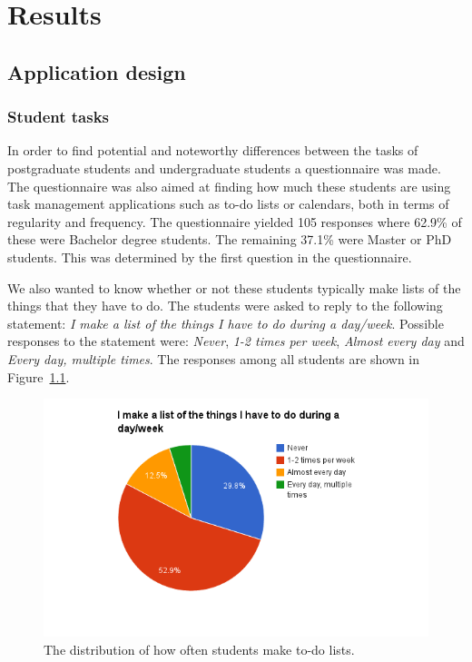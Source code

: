 \chapter{Results}
\label{chap:results}

\section{Application design}

\subsection{Student tasks}
\label{subsec:studenttasks}
In order to find potential and noteworthy differences between the tasks of postgraduate students and undergraduate students a questionnaire was made. The questionnaire was also aimed at finding how much these students are using task management applications such as to-do lists or calendars, both in terms of regularity and frequency. The questionnaire yielded 105 responses where 62.9\% of these were Bachelor degree students. The remaining 37.1\% were Master or PhD students. This was determined by the first question in the questionnaire.

We also wanted to know whether or not these students typically make lists of the things that they have to do. The students were asked to reply to the following statement: \emph{I make a list of the things I have to do during a day/week}. Possible responses to the statement were: \emph{Never}, \emph{1-2 times per week}, \emph{Almost every day} and \emph{Every day, multiple times}. The responses among all students are shown in Figure~\ref{fig:todolistusage}.
\begin{figure}[tbp]
  \centering
  \includegraphics[width=\textwidth]{figures/TodoListUsage.png}
  \caption[To-do list usage]{The distribution of how often students make to-do lists.}
  \label{fig:todolistusage}
\end{figure}

